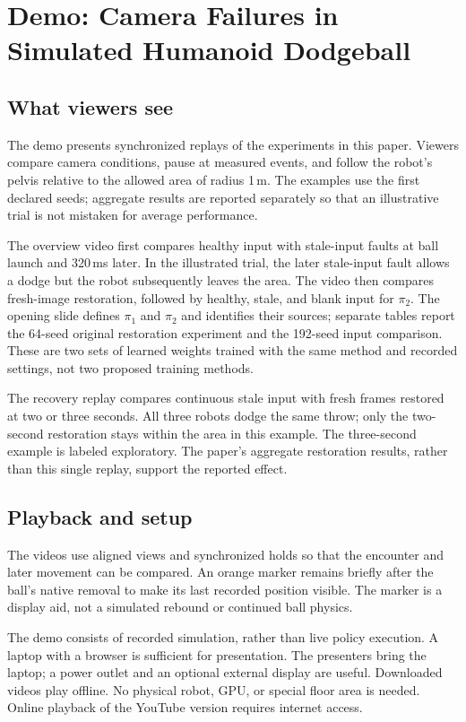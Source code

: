 \section{Demo: Camera Failures in Simulated Humanoid Dodgeball}
\label{app:demo}
\subsection{What viewers see}
The demo presents synchronized replays of the experiments in this paper.
Viewers compare camera conditions, pause at measured events, and follow the
robot's pelvis relative to the allowed area of radius 1\,m. The examples use the first declared
seeds; aggregate results are reported separately so that an illustrative trial
is not mistaken for average performance.

The overview video first compares healthy input with stale-input faults at ball
launch and 320\,ms later. In the illustrated trial, the later stale-input fault allows a
dodge but the robot subsequently leaves the area. The video then compares
fresh-image restoration, followed by healthy, stale, and blank input for
$\pi_2$. The opening slide defines $\pi_1$ and $\pi_2$ and identifies their sources;
separate tables report the 64-seed original restoration experiment and the 192-seed input
comparison. These are two sets of learned weights trained with the same method
and recorded settings, not two proposed training methods.

The recovery replay compares continuous stale input with fresh
frames restored at two or three seconds. All three robots dodge the same throw;
only the two-second restoration stays within the area in this example. The
three-second example is labeled exploratory. The
paper's aggregate restoration results, rather than this single replay, support
the reported effect.

\subsection{Playback and setup}
The videos use aligned views and synchronized holds so that the encounter and
later movement can be compared. An orange marker remains briefly after the
ball's native removal to make its last recorded position visible. The marker
is a display aid, not a simulated rebound or continued ball physics.

The demo consists of recorded simulation, rather than live policy execution.
A laptop with a browser is sufficient for presentation. The presenters bring
the laptop; a power outlet and an optional external display are useful.
Downloaded videos play offline. No physical robot, GPU, or special floor area
is needed. Online playback of the YouTube version requires internet access.

